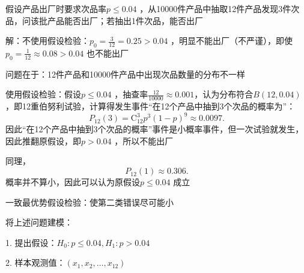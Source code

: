 \begin{eg}
    假设产品出厂时要求次品率$p\le 0.04$ ，从10000件产品中抽取12件产品发现3件次品，问该批产品能否出厂；若抽出1件次品，能否出厂
\end{eg}
解：不使用假设检验：$p_0=\frac{3}{12}=0.25>0.04$ ，明显不能出厂（不严谨），即使$p_0=\frac{1}{12}\approx 0.08>0.04$ 也不能出厂
\begin{notation}
    问题在于：12件产品和10000件产品中出现次品数量的分布不一样
\end{notation}
使用假设检验：假设$p\le 0.04$ ，抽查率$\frac{12}{10000}\approx 0.001$，认为分布符合$B\left( 12,0.04 \right)$ ，即12重伯努利试验，计算得发生事件“在12个产品中抽到3个次品的概率为”： \[
    P_{12}\left( 3 \right)= \mathrm{C}_{12}^{3}p^3 \left( 1-p \right)^{9}\approx0.0097
.\]
因此“在12个产品中抽到3个次品的概率”事件是小概率事件，但一次试验就发生，因此推翻原假设，即$p>0.04$ ，所以不能出厂

同理，\[
    P_{12}\left( 1 \right)\approx 0.306
.\]
概率并不算小，因此可以认为原假设$p\le 0.04$ 成立
\begin{notation}
一致最优势假设检验：使第二类错误尽可能小
\end{notation}
将上述问题建模：

1. 提出假设：$H_0:p\le 0.04, H_1:p>0.04$

2. 样本观测值：$\left( x_1,x_2,\ldots ,x_{12} \right)$


